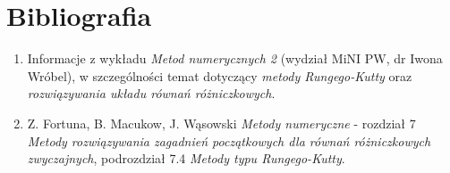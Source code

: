 \documentclass[12pt]{article}
\begin{document}
	\section{Bibliografia}
	\begin{enumerate}
		\item Informacje z wykładu \textit{Metod numerycznych 2} (wydział MiNI PW, dr Iwona Wróbel), w szczególności temat dotyczący \textit{metody Rungego-Kutty} oraz \textit{rozwiązywania układu równań różniczkowych}.
		\item Z. Fortuna, B. Macukow, J. Wąsowski \textit{Metody numeryczne} - rozdział 7 \textit{Metody rozwiązywania zagadnień początkowych dla równań różniczkowych zwyczajnych}, podrozdział 7.4 \textit{Metody typu Rungego-Kutty}.
	\end{enumerate}
	
\end{document}
